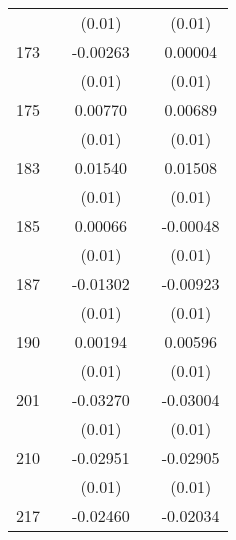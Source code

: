 \begin{table}[htbp]
\begin{tabular}{l*{4}{c}}
                    &                     &      (0.01)         &                     &      (0.01)         \\
173                 &                     &    -0.00263         &                     &     0.00004         \\
                    &                     &      (0.01)         &                     &      (0.01)         \\
175                 &                     &     0.00770         &                     &     0.00689         \\
                    &                     &      (0.01)         &                     &      (0.01)         \\
183                 &                     &     0.01540         &                     &     0.01508         \\
                    &                     &      (0.01)         &                     &      (0.01)         \\
185                 &                     &     0.00066         &                     &    -0.00048         \\
                    &                     &      (0.01)         &                     &      (0.01)         \\
187                 &                     &    -0.01302         &                     &    -0.00923         \\
                    &                     &      (0.01)         &                     &      (0.01)         \\
190                 &                     &     0.00194         &                     &     0.00596         \\
                    &                     &      (0.01)         &                     &      (0.01)         \\
201                 &                     &    -0.03270\sym{***}&                     &    -0.03004\sym{**} \\
                    &                     &      (0.01)         &                     &      (0.01)         \\
210                 &                     &    -0.02951\sym{**} &                     &    -0.02905\sym{**} \\
                    &                     &      (0.01)         &                     &      (0.01)         \\
217                 &                     &    -0.02460\sym{**} &                     &    -0.02034\sym{*}  \\

\end{tabular}
\end{table}
